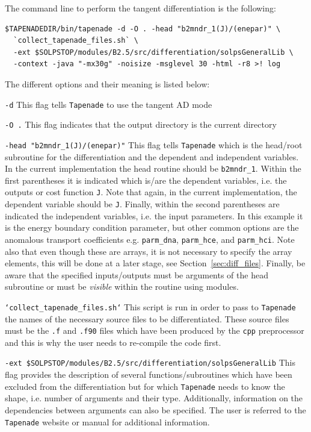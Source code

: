 The command line to perform the tangent differentiation is the following:
\begin{verbatim}
$TAPENADEDIR/bin/tapenade -d -O . -head "b2mndr_1(J)/(enepar)" \
  `collect_tapenade_files.sh` \
  -ext $SOLPSTOP/modules/B2.5/src/differentiation/solpsGeneralLib \
  -context -java "-mx30g" -noisize -msglevel 30 -html -r8 >! log
\end{verbatim}

The different options and their meaning is listed below:
\begin{description}
  \item {\tt -d} This flag tells {\tt Tapenade} to use the tangent AD mode

  \item {\tt -O .} This flag indicates that the output directory is the current directory

  \item {\tt -head "b2mndr\_1(J)/(enepar)"} This flag tells {\tt Tapenade} which is the head/root subroutine for the differentiation and the dependent and independent variables. In the current implementation the head routine should be {\tt b2mndr\_1}. Within the first parentheses it is indicated which is/are the dependent variables, i.e. the outputs or cost function {\tt J}. Note that again, in the current implementation, the dependent variable should be {\tt J}. Finally, within the second parentheses are indicated the independent variables, i.e. the input parameters. In this example it is the energy boundary condition parameter, but other common options are the anomalous transport coefficients e.g. {\tt parm\_dna}, {\tt parm\_hce}, and {\tt parm\_hci}. Note also that even though these are arrays, it is not necessary to specify the array elements, this will be done at a later stage, see Section~\ref{sec:diff_files}. Finally, be aware that the specified inputs/outputs must be arguments of the head subroutine or must be {\em visible} within the routine using modules.

  \item {\tt `collect\_tapenade\_files.sh`} This script is run in order to pass to {\tt Tapenade} the names of the necessary source files to be differentiated. These source files must be the {\tt *.f} and {\tt *.f90} files which have been produced by the {\tt cpp} preprocessor and this is why the user needs to re-compile the code first.

  \item {\tt -ext \$SOLPSTOP/modules/B2.5/src/differentiation/solpsGeneralLib} This flag provides the description of several functions/subroutines which have been excluded from the differentiation but for which {\tt Tapenade} needs to know the shape, i.e. number of arguments and their type. Additionally, information on the dependencies between arguments can also be specified. The user is referred to the {\tt Tapenade} website or manual for additional information.


\end{description}
